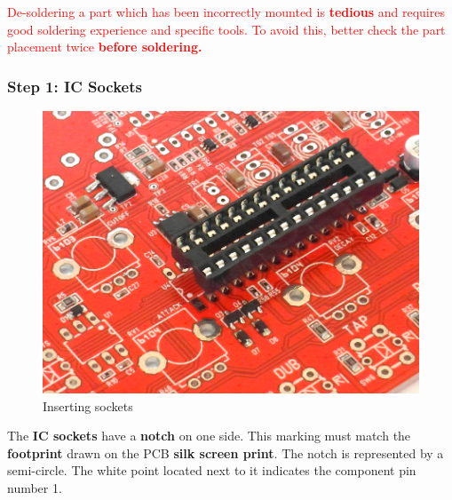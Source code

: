 \documentclass{scrartcl}
\begin{document}
\vspace{0.25cm}
\begin{tcolorbox}
    \textcolor{red}{
        De-soldering a part which has been incorrectly mounted is \textbf{tedious} and requires good soldering experience and specific tools. To avoid this, better check the part placement twice \textbf{before soldering.}
    }
\end{tcolorbox}

\pagebreak
\subsubsection{Step 1: IC Sockets}

\begin{figure}[!ht]
    \begin{center}
        \includegraphics[scale=0.30]{assets/ic-socket.jpg}
        \caption{Inserting sockets}
    \end{center}
\end{figure}

The \textbf{IC sockets} have a \textbf{notch} on one side.
This marking must match the \textbf{footprint} drawn on the PCB \textbf{silk screen print}. The notch is represented by a semi-circle. The white point located next to it indicates the component pin number 1.
\end{document}
